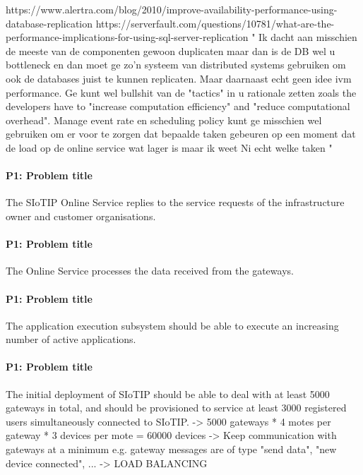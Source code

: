     https://www.alertra.com/blog/2010/improve-availability-performance-using-database-replication
    https://serverfault.com/questions/10781/what-are-the-performance-implications-for-using-sql-server-replication
    "
    Ik dacht aan misschien de meeste van de componenten gewoon duplicaten maar dan is de DB wel u bottleneck en dan moet ge zo'n systeem van distributed systems gebruiken om ook de databases juist te kunnen replicaten.
    Maar daarnaast echt geen idee ivm performance. Ge kunt wel bullshit van de "tactics" in u rationale zetten zoals the developers have to "increase computation efficiency" and "reduce computational overhead".
    Manage event rate en scheduling policy kunt ge misschien wel gebruiken om er voor te zorgen dat bepaalde taken gebeuren op een moment dat de load op de online service wat lager is maar ik weet Ni echt welke taken
    "


    \paragraph{P1: Problem title}
        The SIoTIP Online Service replies to the service requests of the
        infrastructure owner and customer organisations.

    \paragraph{P1: Problem title}
        The Online Service processes the data received from the gateways.

    \paragraph{P1: Problem title}
        The application execution subsystem should be able to execute an increasing
        number of active applications.

    \paragraph{P1: Problem title}
        The initial deployment of SIoTIP should be able to deal with at least 5000
        gateways in total, and should be provisioned to service at least 3000
        registered users simultaneously connected to SIoTIP.
        -> 5000 gateways * 4 motes per gateway * 3 devices per mote = 60000 devices
        -> Keep communication with gateways at a minimum
           e.g. gateway messages are of type "send data", "new device connected", ...
        -> LOAD BALANCING

